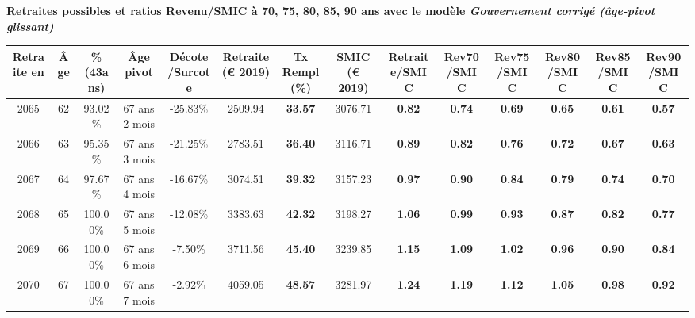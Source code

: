  \vspace{0.1cm} 
{\bf \noindent Retraites possibles et ratios Revenu/SMIC à 70, 75, 80, 85, 90 ans avec le modèle \emph{Gouvernement corrigé (âge-pivot glissant)}}  
 
\begin{adjustbox}{max width=\textwidth} 
\begin{tabular}[htb]{|c|c||c|c|c||c|c||c||c|c|c|c|c|c|} 
\hline 
 Retraite en &  Âge &  \%(43ans) &  Âge pivot &  Décote/Surcote &  Retraite (\euro{} 2019) &  Tx Rempl(\%) &  SMIC (\euro{} 2019) &  Retraite/SMIC &  Rev70/SMIC &  Rev75/SMIC &  Rev80/SMIC &  Rev85/SMIC &  Rev90/SMIC \\ 
\hline \hline 
 2065 &  62 &  93.02\% &  67 ans 2 mois &  -25.83\% &  2509.94 &  {\bf 33.57} &  3076.71 &  {\bf {\color{red} 0.82}} &  {\bf {\color{red} 0.74}} &  {\bf {\color{red} 0.69}} &  {\bf {\color{red} 0.65}} &  {\bf {\color{red} 0.61}} &  {\bf {\color{red} 0.57}} \\ 
\hline 
 2066 &  63 &  95.35\% &  67 ans 3 mois &  -21.25\% &  2783.51 &  {\bf 36.40} &  3116.71 &  {\bf {\color{red} 0.89}} &  {\bf {\color{red} 0.82}} &  {\bf {\color{red} 0.76}} &  {\bf {\color{red} 0.72}} &  {\bf {\color{red} 0.67}} &  {\bf {\color{red} 0.63}} \\ 
\hline 
 2067 &  64 &  97.67\% &  67 ans 4 mois &  -16.67\% &  3074.51 &  {\bf 39.32} &  3157.23 &  {\bf {\color{red} 0.97}} &  {\bf {\color{red} 0.90}} &  {\bf {\color{red} 0.84}} &  {\bf {\color{red} 0.79}} &  {\bf {\color{red} 0.74}} &  {\bf {\color{red} 0.70}} \\ 
\hline 
 2068 &  65 &  100.00\% &  67 ans 5 mois &  -12.08\% &  3383.63 &  {\bf 42.32} &  3198.27 &  {\bf 1.06} &  {\bf {\color{red} 0.99}} &  {\bf {\color{red} 0.93}} &  {\bf {\color{red} 0.87}} &  {\bf {\color{red} 0.82}} &  {\bf {\color{red} 0.77}} \\ 
\hline 
 2069 &  66 &  100.00\% &  67 ans 6 mois &  -7.50\% &  3711.56 &  {\bf 45.40} &  3239.85 &  {\bf 1.15} &  {\bf 1.09} &  {\bf 1.02} &  {\bf {\color{red} 0.96}} &  {\bf {\color{red} 0.90}} &  {\bf {\color{red} 0.84}} \\ 
\hline 
 2070 &  67 &  100.00\% &  67 ans 7 mois &  -2.92\% &  4059.05 &  {\bf 48.57} &  3281.97 &  {\bf 1.24} &  {\bf 1.19} &  {\bf 1.12} &  {\bf 1.05} &  {\bf {\color{red} 0.98}} &  {\bf {\color{red} 0.92}} \\ 
\hline 
\hline 
\end{tabular} 
\end{adjustbox} 
 
